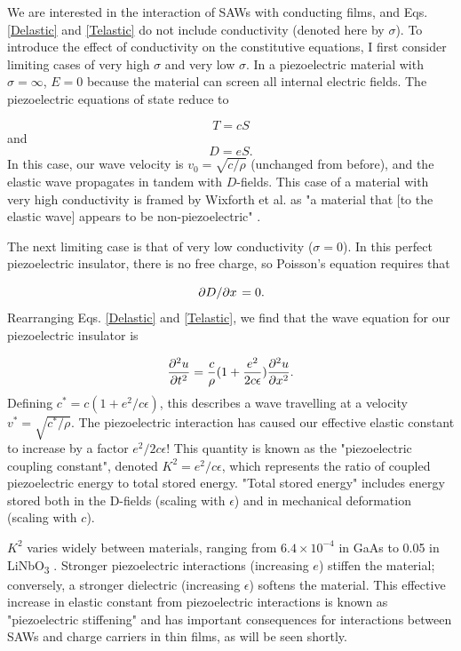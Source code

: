 \documentclass[double,12pt,1in]{beavtex}
\begin{document}
We are interested in the interaction of SAWs with conducting films, and Eqs. \ref{Delastic} and \ref{Telastic} do not include conductivity (denoted here by $\sigma$). To introduce the effect of conductivity on the constitutive equations, I first consider limiting cases of very high $\sigma$ and very low $\sigma$. In a piezoelectric material with $\sigma = \infty$, $E = 0$ because the material can screen all internal electric fields. The piezoelectric equations of state reduce to 

\begin{equation}
    T = cS
\end{equation}
and
\begin{equation}
    D = eS.
\end{equation}
In this case, our wave velocity is $v_0 = \sqrt{c/\rho}$ (unchanged from before), and the elastic wave propagates in tandem with $D$-fields. This case of a material with very high conductivity is framed by Wixforth et al. as "a material that [to the elastic wave] appears to be non-piezoelectric" \cite{wixforth_surface_1989}.

The next limiting case is that of very low conductivity ($\sigma = 0$). In this perfect piezoelectric insulator, there is no free charge, so Poisson's equation requires that 

\begin{equation}
    \pdv*{D}{x} = 0.
\end{equation}
Rearranging Eqs. \ref{Delastic} and \ref{Telastic}, we find that the wave equation for our piezoelectric insulator is

\begin{equation}
    \pdv[2]{u}{t} = \frac{c}{\rho} (1 + \frac{e^2}{2c\epsilon}) \pdv[2]{u}{x}. \label{wave eqn for insulator}
\end{equation}
Defining $c^* = c(1 + e^2/c\epsilon)$, this describes a wave travelling at a velocity $v^* =\sqrt{c^*/\rho}$. The piezoelectric interaction has caused our effective elastic constant to increase by a factor $e^2/2c\epsilon$! This quantity is known as the "piezoelectric coupling constant", denoted $K^2 = e^2/c\epsilon$, which represents the ratio of coupled piezoelectric energy to total stored energy. "Total stored energy" includes energy stored both in the D-fields (scaling with $\epsilon$) and in mechanical deformation (scaling with $c$). 

$K^2$ varies widely between materials, ranging from $6.4 \times 10^{-4}$ in GaAs \cite{wixforth_surface_1989} to 0.05 in LiNbO\textsubscript{3} \cite{warner_determination_1967}. Stronger piezoelectric interactions (increasing $e$) stiffen the material; conversely, a stronger dielectric (increasing $\epsilon$) softens the material. This effective increase in elastic constant from piezoelectric interactions is known as "piezoelectric stiffening" and has important consequences for interactions between SAWs and charge carriers in thin films, as will be seen shortly. 
\end{document}

